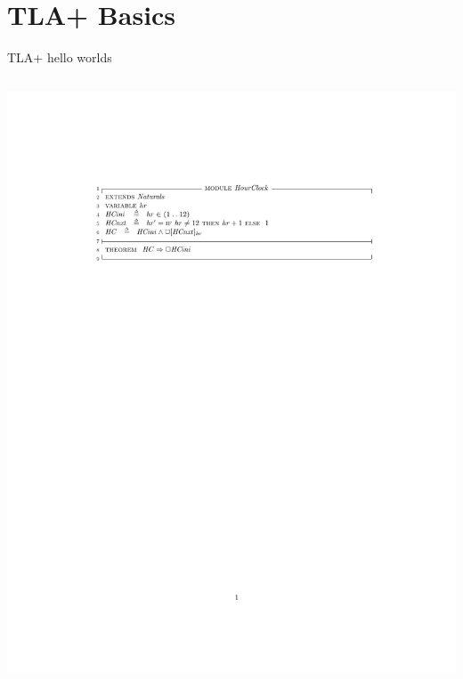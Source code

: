 \documentclass[12pt]{beamer}
\begin{document}
  \section{TLA+ Basics}
  \begin{frame}{TLA+ hello worlds}
    \begin{center}
      \inputminted[linenos,fontsize=\scriptsize]{tla}{figures/hourclock.tla}
      \includegraphics[scale=0.8]{figures/hourclock.pdf}
    \end{center}
  \end{frame}
\end{document}
